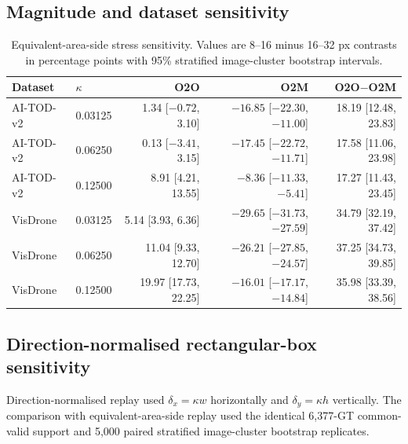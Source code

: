 \documentclass[preprint,10pt]{elsarticle}
\begin{document}
\subsection{Magnitude and dataset sensitivity}

\begin{table}[ht]
\centering
\caption{Equivalent-area-side stress sensitivity. Values are 8--16 minus 16--32 px contrasts in percentage points with 95\% stratified image-cluster bootstrap intervals.}
\begin{tabular}{@{}llrrr@{}}
\toprule
Dataset & $\kappa$ & O2O & O2M & O2O$-$O2M \\
\midrule
AI-TOD-v2 & 0.03125 & 1.34 [$-0.72$, 3.10] & $-16.85$ [$-22.30$, $-11.00$] & 18.19 [12.48, 23.83] \\
AI-TOD-v2 & 0.06250 & 0.13 [$-3.41$, 3.15] & $-17.45$ [$-22.72$, $-11.71$] & 17.58 [11.06, 23.98] \\
AI-TOD-v2 & 0.12500 & 8.91 [4.21, 13.55] & $-8.36$ [$-11.33$, $-5.41$] & 17.27 [11.43, 23.45] \\
VisDrone & 0.03125 & 5.14 [3.93, 6.36] & $-29.65$ [$-31.73$, $-27.59$] & 34.79 [32.19, 37.42] \\
VisDrone & 0.06250 & 11.04 [9.33, 12.70] & $-26.21$ [$-27.85$, $-24.57$] & 37.25 [34.73, 39.85] \\
VisDrone & 0.12500 & 19.97 [17.73, 22.25] & $-16.01$ [$-17.17$, $-14.84$] & 35.98 [33.39, 38.56] \\
\bottomrule
\end{tabular}
\end{table}

\subsection{Direction-normalised rectangular-box sensitivity}

Direction-normalised replay used $\delta_x=\kappa w$ horizontally and $\delta_y=\kappa h$ vertically. The comparison with equivalent-area-side replay used the identical 6,377-GT common-valid support and 5,000 paired stratified image-cluster bootstrap replicates.

\begin{table}[ht]
\centering
\caption{Equivalent-area-side versus direction-normalised scale contrasts. Observed rows use each contract's canonical formal summary. Aspect-standardised rows are a separate paired composition sensitivity that applies a common pooled aspect-ratio distribution to both size groups.}
\resizebox{\textwidth}{!}{}
\end{table}
\end{document}
